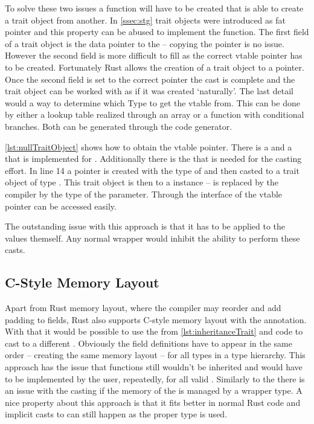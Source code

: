 \documentclass[thesis]{subfiles}
\begin{document}
    To solve these two issues a  function will have to be created that is able to create a trait object from another.
    In \autoref{ssec:stg} trait objects were introduced as fat pointer and this property can be abused to implement the  function.
    The first field of a trait object is the data pointer to the \struct -- copying the pointer is no issue.
    However the second field is more difficult to fill as the correct vtable pointer has to be created.
    Fortunately Rust allows the creation of a trait object to a  pointer.
    Once the second field is set to the correct pointer the cast is complete and the trait object can be worked with as if it was created `naturally'.
    The last detail would a way to determine which Type to get the vtable from.
    This can be done by either a lookup table realized through an array or a function with conditional branches.
    Both can be generated through the code generator.

    

    \autoref{lst:nullTraitObject} shows how to obtain the vtable pointer.
    There is a  and a  that is implemented for .
    Additionally there is the  that is needed for the casting effort.
    In line 14 a  pointer is created with the type of  and then casted to a trait object of type .
    This trait object is then  to a  instance -- \codr{_} is replaced by the compiler by the type of the parameter.
    Through the interface of  the vtable pointer can be accessed easily.

    The outstanding issue with this approach is that it has to be applied to the values themself.
    Any normal wrapper would inhibit the ability to perform these casts.

  \subsection{C-Style Memory Layout}
    Apart from Rust memory layout, where the compiler may reorder and add padding to fields, Rust also supports C-style memory layout with the \codr{#[repr(C)]} annotation.
    With that it would be possible to use the \structs from \autoref{lst:inheritanceTrait} and  code to cast to a different \struct.
    Obviously the field definitions have to appear in the same order -- creating the same memory layout -- for all types in a type hierarchy.
    This approach has the issue that functions still wouldn't be inherited and would have to be implemented by the user, repeatedly, for all valid \structs.
    Similarly to the \traits there is an issue with the casting if the memory of the \struct is managed by a wrapper type.
    A nice property about this approach is that it fits better in normal Rust code and implicit casts to  can still happen as the proper type is used.
\end{document}

